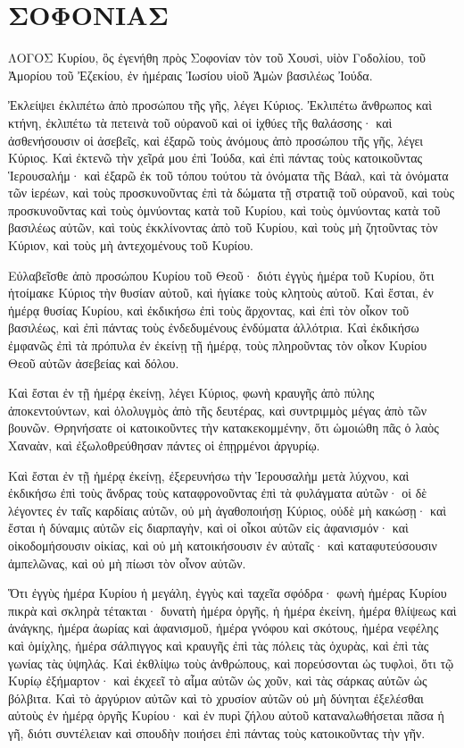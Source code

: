 \begin{spacing}{1.1}
\begin{multicols}{2}
\end{multicols}
\chapter{ΣΟΦΟΝΙΑΣ}
\begin{multicols}{2}

ΛΟΓΟΣ Κυρίου, ὃς ἐγενήθη πρὸς Σοφονίαν τὸν τοῦ Χουσὶ, υἱὸν Γοδολίου, τοῦ Ἀμορίου τοῦ Ἐζεκίου, ἐν ἡμέραις Ἰωσίου υἱοῦ Ἀμὼν βασιλέως Ἰούδα.

Ἐκλείψει ἐκλιπέτω ἀπὸ προσώπου τῆς γῆς, λέγει Κύριος.
Ἐκλιπέτω ἄνθρωπος καὶ κτήνη, ἐκλιπέτω τὰ πετεινὰ τοῦ οὐρανοῦ καὶ οἱ ἰχθύες τῆς θαλάσσης· καὶ ἀσθενήσουσιν οἱ ἀσεβεῖς, καὶ ἐξαρῶ τοὺς ἀνόμους ἀπὸ προσώπου τῆς γῆς, λέγει Κύριος.
Καὶ ἐκτενῶ τὴν χεῖρά μου ἐπὶ Ἰούδα, καὶ ἐπὶ πάντας τοὺς κατοικοῦντας Ἱερουσαλήμ· καὶ ἐξαρῶ ἐκ τοῦ τόπου τούτου τὰ ὀνόματα τῆς Βάαλ, καὶ τὰ ὀνόματα τῶν ἱερέων,
καὶ τοὺς προσκυνοῦντας ἐπὶ τὰ δώματα τῇ στρατιᾷ τοῦ οὐρανοῦ, καὶ τοὺς προσκυνοῦντας καὶ τοὺς ὀμνύοντας κατὰ τοῦ Κυρίου, καὶ τοὺς ὀμνύοντας κατὰ τοῦ βασιλέως αὐτῶν,
καὶ τοὺς ἐκκλίνοντας ἀπὸ τοῦ Κυρίου, καὶ τοὺς μὴ ζητοῦντας τὸν Κύριον, καὶ τοὺς μὴ ἀντεχομένους τοῦ Κυρίου.

Εὐλαβεῖσθε ἀπὸ προσώπου Κυρίου τοῦ Θεοῦ· διότι ἐγγὺς ἡμέρα τοῦ Κυρίου, ὅτι ἡτοίμακε Κύριος τὴν θυσίαν αὐτοῦ, καὶ ἡγίακε τοὺς κλητοὺς αὐτοῦ.
Καὶ ἔσται, ἐν ἡμέρᾳ θυσίας Κυρίου, καὶ ἐκδικήσω ἐπὶ τοὺς ἄρχοντας, καὶ ἐπὶ τὸν οἶκον τοῦ βασιλέως, καὶ ἐπὶ πάντας τοὺς ἐνδεδυμένους ἐνδύματα ἀλλότρια.
Καὶ ἐκδικήσω ἐμφανῶς ἐπὶ τὰ πρόπυλα ἐν ἐκείνῃ τῇ ἡμέρᾳ, τοὺς πληροῦντας τὸν οἶκον Κυρίου Θεοῦ αὐτῶν ἀσεβείας καὶ δόλου.

Καὶ ἔσται ἐν τῇ ἡμέρᾳ ἐκείνῃ, λέγει Κύριος, φωνὴ κραυγῆς ἀπὸ πύλης ἀποκεντούντων, καὶ ὀλολυγμὸς ἀπὸ τῆς δευτέρας, καὶ συντριμμὸς μέγας ἀπὸ τῶν βουνῶν.
Θρηνήσατε οἱ κατοικοῦντες τὴν κατακεκομμένην, ὅτι ὡμοιώθη πᾶς ὁ λαὸς Χαναὰν, καὶ ἐξωλοθρεύθησαν πάντες οἱ ἐπῃρμένοι ἀργυρίῳ.

Καὶ ἔσται ἐν τῇ ἡμέρᾳ ἐκείνῃ, ἐξερευνήσω τὴν Ἱερουσαλὴμ μετὰ λύχνου, καὶ ἐκδικήσω ἐπὶ τοὺς ἄνδρας τοὺς καταφρονοῦντας ἐπὶ τὰ φυλάγματα αὐτῶν· οἱ δὲ λέγοντες ἐν ταῖς καρδίαις αὐτῶν, οὐ μὴ ἀγαθοποιήσῃ Κύριος, οὐδὲ μὴ κακώσῃ·
καὶ ἔσται ἡ δύναμις αὐτῶν εἰς διαρπαγὴν, καὶ οἱ οἶκοι αὐτῶν εἰς ἀφανισμόν· καὶ οἰκοδομήσουσιν οἰκίας, καὶ οὐ μὴ κατοικήσουσιν ἐν αὐταῖς· καὶ καταφυτεύσουσιν ἀμπελῶνας, καὶ οὐ μὴ πίωσι τὸν οἶνον αὐτῶν.

Ὅτι ἐγγὺς ἡμέρα Κυρίου ἡ μεγάλη, ἐγγὺς καὶ ταχεῖα σφόδρα· φωνὴ ἡμέρας Κυρίου πικρὰ καὶ σκληρὰ τέτακται·
δυνατὴ ἡμέρα ὀργῆς, ἡ ἡμέρα ἐκείνη, ἡμέρα θλίψεως καὶ ἀνάγκης, ἡμέρα ἀωρίας καὶ ἀφανισμοῦ, ἡμέρα γνόφου καὶ σκότους, ἡμέρα νεφέλης καὶ ὁμίχλης,
ἡμέρα σάλπιγγος καὶ κραυγῆς ἐπὶ τὰς πόλεις τὰς ὀχυρὰς, καὶ ἐπὶ τὰς γωνίας τὰς ὑψηλάς.
Καὶ ἐκθλίψω τοὺς ἀνθρώπους, καὶ πορεύσονται ὡς τυφλοὶ, ὅτι τῷ Κυρίῳ ἐξήμαρτον· καὶ ἐκχεεῖ τὸ αἷμα αὐτῶν ὡς χοῦν, καὶ τὰς σάρκας αὐτῶν ὡς βόλβιτα.
Καὶ τὸ ἀργύριον αὐτῶν καὶ τὸ χρυσίον αὐτῶν οὐ μὴ δύνηται ἐξελέσθαι αὐτοὺς ἐν ἡμέρᾳ ὀργῆς Κυρίου· καὶ ἐν πυρὶ ζήλου αὐτοῦ καταναλωθήσεται πᾶσα ἡ γῆ, διότι συντέλειαν καὶ σπουδὴν ποιήσει ἐπὶ πάντας τοὺς κατοικοῦντας τὴν γῆν.


\end{multicols}
\end{spacing}
